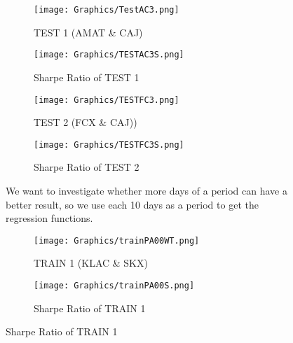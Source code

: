 \begin{figure}[H]
\begin{subfigure}{.5\textwidth}%
\centering
\texttt{[image: Graphics/TestAC3.png]} \caption{TEST 1 (AMAT \& CAJ)} 
\end{subfigure}%
\begin{subfigure}{.5\textwidth}%
\centering
\texttt{[image: Graphics/TESTAC3S.png]} \caption{Sharpe Ratio of TEST 1}
\end{subfigure}%
\vspace{0.1cm}
\begin{subfigure}{.5\textwidth}%
\centering
\texttt{[image: Graphics/TESTFC3.png]} \caption{TEST 2 (FCX \& CAJ))} 
\end{subfigure}%
\begin{subfigure}{.5\textwidth}%
\centering
\texttt{[image: Graphics/TESTFC3S.png]} \caption{Sharpe Ratio of TEST 2}
\end{subfigure}%
\vspace{0.7cm}
We want to investigate whether more days of a period can have a better result, so we use each 10 days as a period to get the regression functions.
\vspace{0.7cm}
\begin{subfigure}{.5\textwidth}%
\centering
\texttt{[image: Graphics/trainPA00WT.png]} \caption{TRAIN 1 (KLAC \& SKX)} 
\end{subfigure}%
\begin{subfigure}{.5\textwidth}%
\centering
\texttt{[image: Graphics/trainPA00S.png]} \caption{Sharpe Ratio of TRAIN 1}
\end{subfigure}%
\end{figure}

